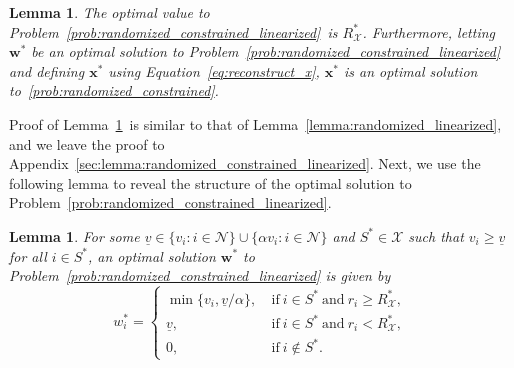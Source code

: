 \documentclass[mnsc,non-blindrev]{informs3}
\newtheorem{lemma}[theorem]{Lemma}
\theoremstyle{definition}
\begin{document}
\begin{lemma}
The optimal value to Problem~\eqref{prob:randomized_constrained_linearized}~is $R_{\mathcal{X}}^*$. Furthermore, letting $\bm{w}^*$ be an optimal solution to Problem~\eqref{prob:randomized_constrained_linearized} and defining $\bm{x}^*$ using Equation~\eqref{eq:reconstruct_x}, $\bm{x}^*$ is an optimal solution to~\ref{prob:randomized_constrained}.\label{lemma:randomized_constrained_linearized}
\end{lemma}

\vspace{0.5em}

Proof of Lemma~\ref{lemma:randomized_constrained_linearized}~is similar to that of Lemma~\ref{lemma:randomized_linearized}, and we leave the proof to Appendix~\ref{sec:lemma:randomized_constrained_linearized}. Next, we use the following lemma to reveal the structure of the optimal solution to Problem~\eqref{prob:randomized_constrained_linearized}.

\vspace{0.5em}

\begin{lemma}\label{lemma:w_structure}
For some $\underline{v}\in\{v_i:i\in\mathcal{N}\}\cup\{\alpha v_i:i\in\mathcal{N}\}$ and $S^*\in\mathcal{X}$ such that $v_i\geq \underline{v}$ for all $i\in S^*$, an optimal solution $\bm{w}^*$ to Problem~\eqref{prob:randomized_constrained_linearized} is given by
\begin{equation}
w_i^*=\begin{cases}
\min\{v_i,\underline{v}/\alpha\},\ &\text{if}\ i\in S^*\ \text{and}\ r_i\geq R_{\mathcal{X}}^*,\\
\underline{v},\ &\text{if}\ i\in S^*\ \text{and}\ r_i<R_{\mathcal{X}}^*,\\
0,\ &\text{if}\ i\notin S^*.
\end{cases}\label{eq:w_structure}
\end{equation}
\end{lemma}

\vspace{0.5em}
\end{document}
